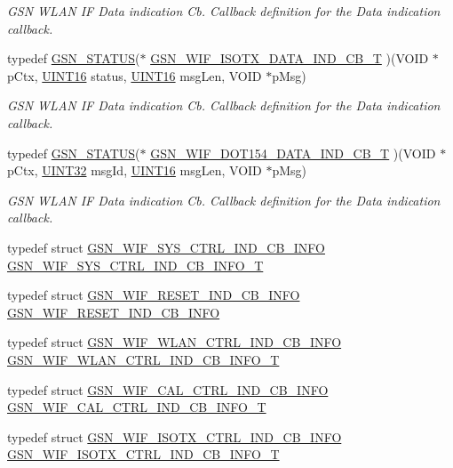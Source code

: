 \begin{DoxyCompactItemize}
\begin{DoxyCompactList}\small\item\em GSN WLAN IF Data indication Cb. Callback definition for the Data indication callback. \end{DoxyCompactList}\item 
typedef \hyperlink{a00660_gada5951904ac6110b1fa95e51a9ddc217}{GSN\_\-STATUS}($\ast$ \hyperlink{a00635_ga9630fce1058035404e218cc275052c03}{GSN\_\-WIF\_\-ISOTX\_\-DATA\_\-IND\_\-CB\_\-T} )(VOID $\ast$pCtx, \hyperlink{a00660_ga09f1a1fb2293e33483cc8d44aefb1eb1}{UINT16} status, \hyperlink{a00660_ga09f1a1fb2293e33483cc8d44aefb1eb1}{UINT16} msgLen, VOID $\ast$pMsg)
\begin{DoxyCompactList}\small\item\em GSN WLAN IF Data indication Cb. Callback definition for the Data indication callback. \end{DoxyCompactList}\item 
typedef \hyperlink{a00660_gada5951904ac6110b1fa95e51a9ddc217}{GSN\_\-STATUS}($\ast$ \hyperlink{a00635_gaeb1ca28d0827d970df3911f1bd46cf98}{GSN\_\-WIF\_\-DOT154\_\-DATA\_\-IND\_\-CB\_\-T} )(VOID $\ast$pCtx, \hyperlink{a00660_gae1e6edbbc26d6fbc71a90190d0266018}{UINT32} msgId, \hyperlink{a00660_ga09f1a1fb2293e33483cc8d44aefb1eb1}{UINT16} msgLen, VOID $\ast$pMsg)
\begin{DoxyCompactList}\small\item\em GSN WLAN IF Data indication Cb. Callback definition for the Data indication callback. \end{DoxyCompactList}\item 
typedef struct \hyperlink{a00349}{GSN\_\-WIF\_\-SYS\_\-CTRL\_\-IND\_\-CB\_\-INFO} \hyperlink{a00608_af3449294e8213905d6a1262eeca51d1d}{GSN\_\-WIF\_\-SYS\_\-CTRL\_\-IND\_\-CB\_\-INFO\_\-T}
\item 
typedef struct \hyperlink{a00344}{GSN\_\-WIF\_\-RESET\_\-IND\_\-CB\_\-INFO} \hyperlink{a00608_ad8fc5701c1ca18f0e02a58899f1f8e18}{GSN\_\-WIF\_\-RESET\_\-IND\_\-CB\_\-INFO}
\item 
typedef struct \hyperlink{a00378}{GSN\_\-WIF\_\-WLAN\_\-CTRL\_\-IND\_\-CB\_\-INFO} \hyperlink{a00608_ad5a0e6d80f2a6d178d4ee735102839eb}{GSN\_\-WIF\_\-WLAN\_\-CTRL\_\-IND\_\-CB\_\-INFO\_\-T}
\item 
typedef struct \hyperlink{a00318}{GSN\_\-WIF\_\-CAL\_\-CTRL\_\-IND\_\-CB\_\-INFO} \hyperlink{a00608_a986978710017f6f756b07937f1ef5632}{GSN\_\-WIF\_\-CAL\_\-CTRL\_\-IND\_\-CB\_\-INFO\_\-T}
\item 
typedef struct \hyperlink{a00339}{GSN\_\-WIF\_\-ISOTX\_\-CTRL\_\-IND\_\-CB\_\-INFO} \hyperlink{a00608_ad865213747ea3e3ee3465399543d1bcd}{GSN\_\-WIF\_\-ISOTX\_\-CTRL\_\-IND\_\-CB\_\-INFO\_\-T}

\end{DoxyCompactItemize}
